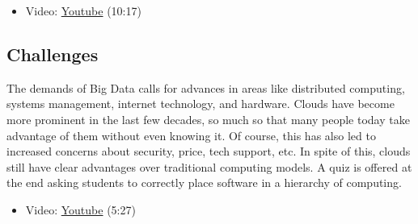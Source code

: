 \begin{itemize}
\tightlist
\item
  Video: \href{https://www.youtube.com/watch?v=_irz3v1gT-A}{Youtube}
  (10:17)
\end{itemize}

\subsection{Challenges}\label{challenges}

The demands of Big Data calls for advances in areas like distributed
computing, systems management, internet technology, and hardware. Clouds
have become more prominent in the last few decades, so much so that many
people today take advantage of them without even knowing it. Of course,
this has also led to increased concerns about security, price, tech
support, etc. In spite of this, clouds still have clear advantages over
traditional computing models. A quiz is offered at the end asking
students to correctly place software in a hierarchy of computing.

\begin{itemize}
\tightlist
\item
  Video: \href{https://www.youtube.com/watch?v=VpDRGcBe4s8}{Youtube}
  (5:27)
\end{itemize}
